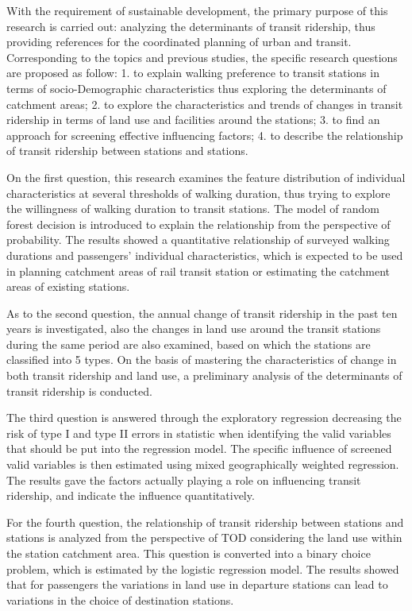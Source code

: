 \documentclass[12pt, twoside, a4paper]{book} %
\begin{document}
With the requirement of sustainable development, the primary purpose of this research is carried out: analyzing the determinants of transit ridership, thus providing references for the coordinated planning of urban and transit. Corresponding to the topics and previous studies, the specific research questions are proposed as follow: 1. to explain walking preference to transit stations in terms of socio-Demographic characteristics thus exploring the determinants of catchment areas; 2. to explore the characteristics and trends of changes in transit ridership in terms of land use and facilities around the stations; 3. to find an approach for screening effective influencing factors; 4. to describe the relationship of transit ridership between stations and stations.

On the first question, this research examines the feature distribution of individual characteristics at several thresholds of walking duration, thus trying to explore the willingness of walking duration to transit stations. The model of random forest decision is introduced to explain the relationship from the perspective of probability. The results showed a quantitative relationship of surveyed walking durations and passengers' individual characteristics, which is expected to be used in planning catchment areas of rail transit station or estimating the catchment areas of existing stations.

As to the second question, the annual change of transit ridership in the past ten years is investigated, also the changes in land use around the transit stations during the same period are also examined, based on which the stations are classified into 5 types. On the basis of mastering the characteristics of change in both transit ridership and land use, a preliminary analysis of the determinants of transit ridership is conducted.

The third question is answered through the exploratory regression decreasing the risk of type I and type II errors in statistic when identifying the valid variables that should be put into the regression model. The specific influence of screened valid variables is then estimated using mixed geographically weighted regression. The results gave the factors actually playing a role on influencing transit ridership, and indicate the influence quantitatively. 

For the fourth question, the relationship of transit ridership between stations and stations is analyzed from the perspective of TOD considering the land use within the station catchment area. This question is converted into a binary choice problem, which is estimated by the logistic regression model. The results showed that for passengers the variations in land use in departure stations can lead to variations in the choice of destination stations.
\end{document}
